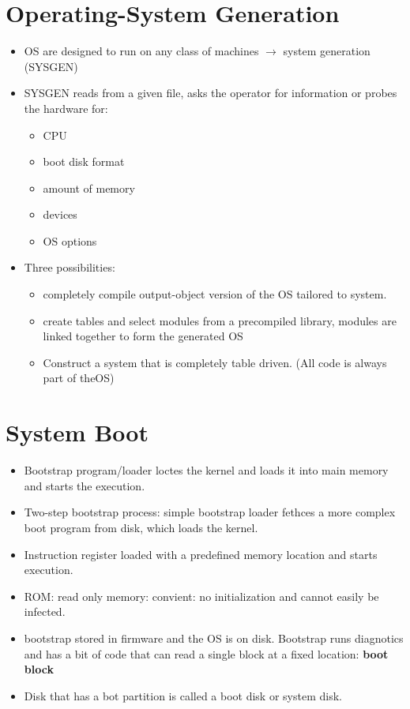 \documentclass[10pt]{report}
\begin{document}
      \section{Operating-System Generation}
        \begin{itemize}
          \item OS are designed to run on any class of machines $\rightarrow$ system generation (SYSGEN)
          \item SYSGEN reads from a given file, asks the operator for information or probes the hardware for:
          \begin{itemize}
            \item CPU
            \item boot disk format
            \item amount of memory
            \item devices
            \item OS options
          \end{itemize}
          \item Three possibilities:
          \begin{itemize}
            \item completely compile output-object version of the OS tailored to system.
            \item create tables and select modules from a precompiled library, modules are linked together to form the generated OS
            \item Construct a system that is completely table driven. (All code is always part of theOS)
          \end{itemize}
        \end{itemize}

      \section{System Boot}
        \begin{itemize}
          \item Bootstrap program/loader loctes the kernel and loads it into main memory and starts the execution.
          \item Two-step bootstrap process: simple bootstrap loader fethces a more complex boot program from disk, which loads the kernel.
          \item Instruction register loaded with a predefined memory location and starts execution.
          \item ROM: read only memory: convient: no initialization and cannot easily be infected.
          \item bootstrap stored in firmware and the OS is on disk. Bootstrap runs diagnotics and has a bit of code that can read a single block at a fixed location: \textbf{boot block}
          \item Disk that has a bot partition is called a boot disk or system disk.
        \end{itemize}
\end{document}
